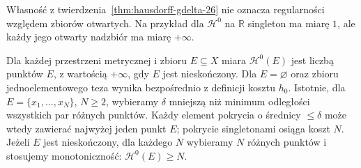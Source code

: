 \begin{uwaga}
Własność z twierdzenia~\ref{thm:hausdorff-gdelta-26}
nie oznacza regularności względem zbiorów otwartych.
Na przykład dla $\mathcal H^0$ na $\mathbb R$
singleton ma miarę $1$, ale każdy jego otwarty
nadzbiór ma miarę $+\infty$.
\end{uwaga}

\begin{przyklad}
\label{prz:hausdorff-counting-26}
Dla każdej przestrzeni metrycznej i zbioru $E\subseteq X$
miara $\mathcal H^0(E)$ jest liczbą punktów $E$,
z wartością $+\infty$, gdy $E$ jest nieskończony.
Dla $E=\varnothing$ oraz zbioru jednoelementowego teza
wynika bezpośrednio z definicji kosztu $h_0$.
Istotnie, dla $E=\{x_1,\ldots,x_N\}$, $N\ge2$,
wybieramy $\delta$ mniejszą niż minimum odległości
wszystkich par różnych punktów.
Każdy element pokrycia o średnicy $\leq\delta$
może wtedy zawierać najwyżej jeden punkt $E$;
pokrycie singletonami osiąga koszt $N$.
Jeżeli $E$ jest nieskończony, dla każdego $N$
wybieramy $N$ różnych punktów i stosujemy
monotoniczność: $\mathcal H^0(E)\geq N$.
\end{przyklad}

